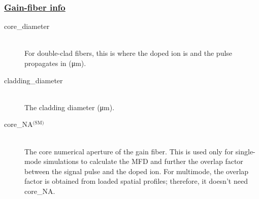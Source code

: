 \documentclass[12pt,hidelinks]{book}
\begin{document}
\subsubsection{\underline{Gain-fiber info}}
\begin{description}
\item[\color{blue}core\_diameter]\mbox{}\\
For double-clad fibers, this is where the doped ion is and the pulse propagates in (\si{\um}).

\item[\color{blue}cladding\_diameter]\mbox{}\\
The cladding diameter (\si{\um}).

\item[core\_NA$^{\text{(SM)}}$]\mbox{}\\
The core numerical aperture of the gain fiber. This is used only for single-mode simulations to calculate the MFD and further the overlap factor between the signal pulse and the doped ion. For multimode, the overlap factor is obtained from loaded spatial profiles; therefore, it doesn't need core\_NA.
\end{description}
\end{document}
